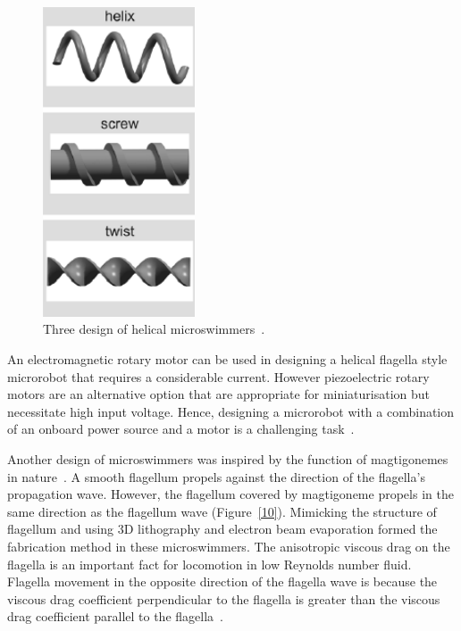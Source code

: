 \documentclass[12pt,a4paper,titlepage]{report}
\begin{document}
\begin{figure}
  \begin{center}
    \includegraphics[width=0.4\textwidth]{HelixShapes}
  \caption[Helical microswimmers design]{Three design of helical microswimmers~\citep{peyer2013magnetic}.}
  \label{HelixShapes}
  \end{center}
\end{figure}



An electromagnetic rotary motor can be used in designing a helical flagella style microrobot that 
requires a considerable current. However piezoelectric rotary motors are an alternative option 
that are appropriate for miniaturisation but necessitate high input voltage.  Hence, designing a microrobot with a 
combination of an onboard power source and a motor is a challenging task~\citep{qiunanohelices}.


Another design of microswimmers was inspired by the function of magtigonemes in nature~\citep{tottori2013artificial}.
 A smooth flagellum propels against the direction of the flagella\rq{}s propagation wave. However, 
the flagellum covered by magtigoneme propels in the same direction as the flagellum wave (Figure~\ref{10}). Mimicking 
the structure of flagellum and using 3D lithography and electron beam evaporation formed the fabrication 
method in these microswimmers.
The anisotropic viscous drag on the flagella is an important fact for locomotion in low Reynolds number fluid. 
Flagella movement in the opposite direction of the flagella wave is because the 
viscous drag coefficient perpendicular to the flagella is greater than the viscous drag coefficient parallel to 
the flagella~\citep{tottori2013artificial}. 
\end{document}
